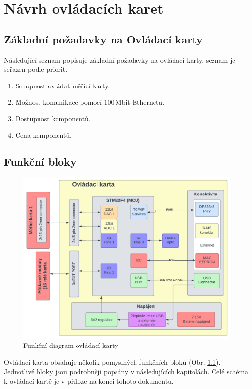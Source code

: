 \chapter{Návrh ovládacích karet}
\section{Základní požadavky na Ovládací karty}
    Následující seznam popisuje základní požadavky na ovládací karty, seznam je seřazen podle priorit.
    \begin{enumerate}
        \item Schopnost ovládat měřící karty.
        \item Možnost komunikace pomocí 100\,Mbit Ethernetu.
        \item Dostupnost komponentů.
        \item Cena komponentů.
    \end{enumerate}

    \section{Funkční bloky}
    \begin{figure}[ht!]
        \centering
        \includegraphics[width = 1\textwidth]{obrazky/ovladaci_karta_diag.png}
        \caption{Funkční diagram ovládací karty}
        \label{fig:Funkční diagram ovládací karty}
        
    \end{figure}

    Ovládací karta obsahuje několik pomyslných funkčních bloků (Obr. \ref{fig:Funkční diagram ovládací karty}).
    Jednotlivé bloky jsou podrobněji popsány v následujících kapitolách. Celé schéma k ovládací kartě je v příloze
    na konci tohoto dokumentu.

